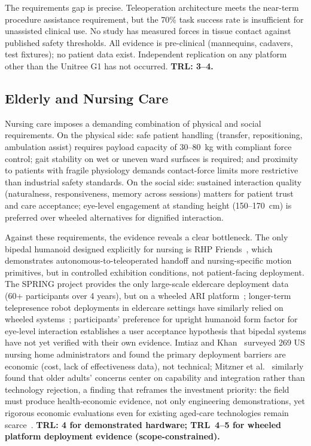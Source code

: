 The requirements gap is precise. Teleoperation architecture meets the
near-term procedure assistance requirement, but the 70\% task success rate is
insufficient for unassisted clinical use. No study has measured forces in
tissue contact against published safety thresholds. All evidence is pre-clinical
(mannequins, cadavers, test fixtures); no patient data exist. Independent
replication on any platform other than the Unitree G1 has not occurred.
\textbf{TRL: 3--4.}

\subsection{Elderly and Nursing Care}
\label{sec:eldercare}

Nursing care imposes a demanding combination of physical and social requirements.
On the physical side: safe patient handling (transfer, repositioning, ambulation
assist) requires payload capacity of 30--80~kg with compliant force control;
gait stability on wet or uneven ward surfaces is required; and proximity to
patients with fragile physiology demands contact-force limits more restrictive
than industrial safety standards. On the social side: sustained interaction
quality (naturalness, responsiveness, memory across sessions) matters for
patient trust and care acceptance; eye-level engagement at standing height
(150--170~cm) is preferred over wheeled alternatives for dignified interaction.

Against these requirements, the evidence reveals a clear bottleneck. The only
bipedal humanoid designed explicitly for nursing is RHP
Friends~\cite{benallegue2025rhp}, which demonstrates autonomous-to-teleoperated
handoff and nursing-specific motion primitives, but in controlled exhibition
conditions, not patient-facing deployment. The SPRING project provides the only
large-scale eldercare deployment data (60+ participants over 4 years), but on a
wheeled ARI platform~\cite{alamedapineda2024spring}; longer-term telepresence
robot deployments in eldercare settings have similarly relied on wheeled
systems~\cite{cesta2016amicare}; participants' preference for
upright humanoid form factor for eye-level interaction establishes a user
acceptance hypothesis that bipedal systems have not yet verified with their own
evidence. Imtiaz and Khan~\cite{imtiaz2024perceptions} surveyed 269 US nursing
home administrators and found the primary deployment barriers are economic
(cost, lack of effectiveness data), not technical; Mitzner et
al.~\cite{mitzner2018technology} similarly found that older adults' concerns
center on capability and integration rather than technology rejection, a finding
that reframes the investment priority: the field must produce health-economic
evidence, not only engineering demonstrations, yet rigorous economic evaluations
even for existing aged-care technologies remain
scarce~\cite{bulamu2018economic}. \textbf{TRL: 4 for demonstrated hardware;
TRL~4--5 for wheeled platform deployment evidence (scope-constrained).}

